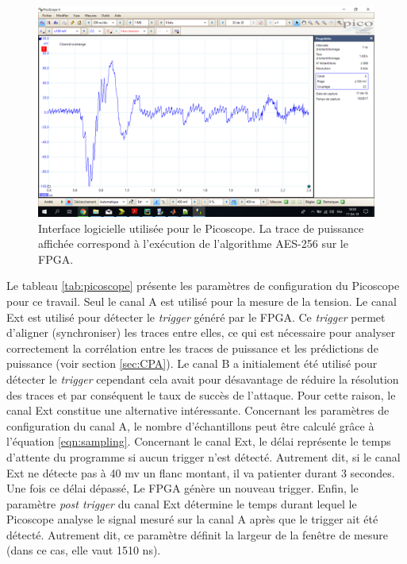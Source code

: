 \documentclass[oneside]{book}
\begin{document}
\begin{figure}[htbp]
    \centering
    \includegraphics[scale=0.45]{image/picoscope_interface}
    \caption{Interface logicielle utilisée pour le Picoscope. La trace de puissance affichée correspond à l'exécution de l'algorithme AES-256 sur le FPGA.}
    \label{fig:picoscope_interface} 
\end{figure}

Le tableau \ref{tab:picoscope} présente les paramètres de configuration du Picoscope pour ce travail. Seul le canal A est utilisé pour la mesure de la tension. Le canal Ext est utilisé pour détecter le \textit{trigger} généré par le FPGA. Ce \textit{trigger} permet d'aligner (synchroniser) les traces entre elles, ce qui est nécessaire pour analyser correctement la corrélation entre les traces de puissance et les prédictions de puissance (voir section \ref{sec:CPA}). Le canal B a initialement été utilisé pour détecter le \textit{trigger} cependant cela avait pour désavantage de réduire la résolution des traces et par conséquent le taux de succès de l'attaque. Pour cette raison, le canal Ext constitue une alternative intéressante. Concernant les paramètres de configuration du canal A, le nombre d'échantillons peut être calculé grâce à l'équation \ref{eqn:sampling}. Concernant le canal Ext, le délai représente le temps d'attente du programme si aucun trigger n'est détecté. Autrement dit, si le canal Ext ne détecte pas à 40 mv un flanc montant, il va patienter durant 3 secondes. Une fois ce délai dépassé, Le FPGA génère un nouveau trigger. Enfin, le paramètre \textit{post trigger} du canal Ext détermine le temps durant lequel le Picoscope analyse le signal mesuré sur la canal A après que le trigger ait été détecté. Autrement dit, ce paramètre définit la largeur de la fenêtre de mesure (dans ce cas, elle vaut 1510 ns). 
\end{document}
